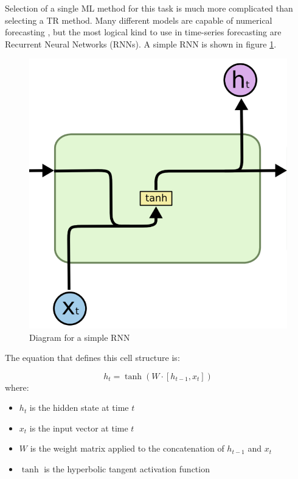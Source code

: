 \documentclass[12pt]{scrreprt}
\begin{document}
Selection of a single ML method for this task is much more complicated than selecting a TR method. Many different models are capable of numerical forecasting \cite{Gao23}, but the most logical kind to use in time-series forecasting are Recurrent Neural Networks (RNNs). A simple RNN is shown in figure \ref{fig:rnn}.

\begin{figure}[h!]
    \centering
    \includegraphics[scale=0.65]{Images/rnn.png}
    \caption{Diagram for a simple RNN \cite{Olah15}}
    \label{fig:rnn}
\end{figure}

The equation that defines this cell structure is:

\begin{equation}
    h_t = \tanh(W \cdot [h_{t-1}, x_t])
\end{equation}
where:
\begin{itemize}
    \item $h_t$ is the hidden state at time $t$
    \item $x_t$ is the input vector at time $t$
    \item $W$ is the weight matrix applied to the concatenation of $h_{t-1}$ and $x_t$
    \item $\tanh$ is the hyperbolic tangent activation function
\end{itemize}
\end{document}
